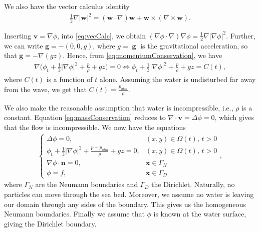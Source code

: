 \documentclass[11pt]{article}
\begin{document}
We also have the vector calculus identity
\begin{align}
    \label{eq:vecCalc}
    \frac{1}{2}\nabla |\bm{w}|^2 = (\bm{w}\cdot \nabla) \bm{w} + \bm{w} \times (\nabla \times \bm{w}).
\end{align}

Inserting $\bm{v} = \nabla \phi$, into \eqref{eq:vecCalc}, we obtain $(\nabla \phi \cdot \nabla) \nabla \phi = \frac{1}{2}\nabla |\nabla \phi|^2.$ Further, we can write $\bm{g} = -(0,0,g)$, where $g = |\bm{g}|$ is the gravitational acceleration, so that
$\bm{g} = -\nabla (gz)$. Hence, from \eqref{eq:momentumConservation}, we have
\begin{align*}
    \nabla\bigg(\phi_t + \frac{1}{2}|\nabla \phi|^2 + \frac{p}{\rho} + g z \bigg) = 0
    \iff \phi_t + \frac{1}{2}|\nabla \phi|^2 + \frac{p}{\rho} + g z = C(t),
\end{align*}
where $C(t)$ is a function of $t$ alone. Assuming the water is undisturbed far away from the wave,
we get that $C(t) = \frac{p_{atm}}{\rho}$.

We also make the reasonable assumption that water is incompressible, i.e., $\rho$ is a constant. Equation \eqref{eq:massConservation} reduces to
$\nabla \cdot \bm{v} = \Delta \phi = 0$, which gives that the flow is incompressible. We now have
the equations
\begin{align}
    \label{eq:IncompNavierStokes}
    \begin{cases}
        \Delta \phi = 0,                                                 &    (x,y) \in \Omega(t), \, t > 0 \\
        \phi_t + \frac{1}{2}|\nabla \phi|^2 + \frac{p-p_{atm}}{\rho} + g z = 0,
                                                                         &    (x,y) \in \Omega(t), \, t > 0 \\
        \nabla \phi \cdot \bm{n} = 0,                                    &    \bm{x} \in \Gamma_N \\
        \phi = f,                                                        &    \bm{x} \in \Gamma_D
    \end{cases},
\end{align}
where $\Gamma_N$ are the Neumann boundaries and $\Gamma_D$ the Dirichlet. Naturally, no particles can move through the sea bed. Moreover, we assume no water is leaving our domain through any sides of the boundary.  This gives us the homogeneous Neumann boundaries. Finally we assume that $\phi$ is known at the water surface, giving the Dirichlet boundary. 
\end{document}
